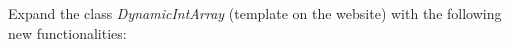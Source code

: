 Expand the class \textit{DynamicIntArray} (template on the website) with 
the following new functionalities:
